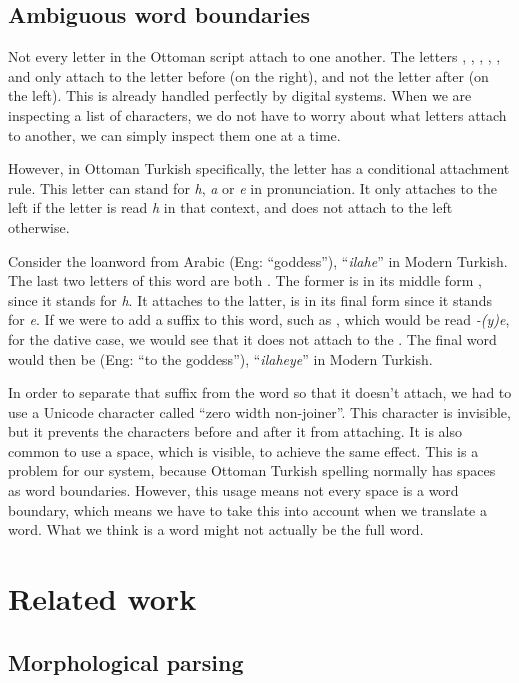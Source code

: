 \documentclass[10pt,twocolumn]{article}
\theoremstyle{nonumberplain}
\newcommand{\otto}[1]{\RLE{\ottoman{}\Large{}#1}}
\newcommand{\word}[1]{``\emph{#1}''}
\begin{document}
\subsection{Ambiguous word boundaries}

Not every letter in the Ottoman script attach to one another.
The letters \otto{ا}, \otto{د}, \otto{ذ}, \otto{ر}, \otto{ز}, \otto{ژ} and \otto{و}
only attach to the letter before (on the right), and not the letter after (on the left).
This is already handled perfectly by digital systems. When we are inspecting a
list of characters, we do not have to worry about what letters attach to
another, we can simply inspect them one at a time.

However, in Ottoman Turkish specifically, the letter \otto{ہ} has a conditional
attachment rule. This letter can stand for \emph{h}, \emph{a} or \emph{e} in
pronunciation. It only attaches to the left if the letter \otto{ہ} is read
\emph{h} in that context, and does not attach to the left otherwise.

Consider the loanword from Arabic \otto{الهه} (Eng: ``goddess''), \word{ilahe} in Modern Turkish.
The last two letters of this word are both \otto{ہ}. The former is in its
middle form \otto{ـهـ}, since it stands for \emph{h}. It attaches to the
latter, is in its final form \otto{ـه} since it stands for \emph{e}.
If we were to add a suffix to this word, such as \otto{يه}, which would be read \emph{-(y)e}, for the dative case, we would see that it does not attach to the \otto{ہ}. The final word would then be \otto{الهه‌يه} (Eng:  ``to the goddess''), \word{ilaheye} in Modern Turkish.

In order to separate that suffix from the word so that it doesn't attach, we
had to use a Unicode character called ``zero width non-joiner''. This character
is invisible, but it prevents the characters before and after it from
attaching.
It is also common to use a space, which is visible, to achieve the same effect.
This is a problem for our system, because Ottoman Turkish spelling normally has
spaces as word boundaries.  However, this usage means not every space is a
word boundary, which means we have to take this into account when we translate
a word. What we think is a word might not actually be the full word.

\section{Related work}

\subsection{Morphological parsing}
\end{document}
